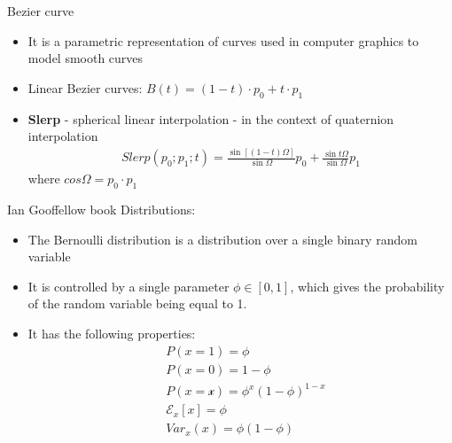 \documentclass[10pt,mathserif]{beamer}
\begin{document}
\begin{frame}{Bezier curve}
\begin{itemize}
\item It is a parametric representation of curves used in computer graphics to model smooth curves
\item Linear Bezier curves: $B(t) = (1-t)\cdot p_0 + t\cdot p_1$
\item \textbf{Slerp} - spherical linear interpolation - in the context of quaternion interpolation
\begin{align}
Slerp(p_0;p_1;t) =\frac{\sin[(1-t)\Omega]}{\sin\Omega}p_0 + \frac{\sin t\Omega}{\sin\Omega}p_1
\end{align}
where $cos\Omega = p_0\cdot p_1$
\end{itemize}
\end{frame}

\begin{frame}{Ian Gooffellow book}
Distributions:
\begin{itemize}
\item The Bernoulli distribution is a distribution over a single binary random variable
\item It is controlled by a single parameter $\phi \in [0,1]$, which gives the probability of the 
random variable being equal to 1.
\item It has the following properties:
\begin{align}
& P(x = 1) = \phi \\
& P(x = 0) = 1 - \phi \\
& P(x = \mathcal{x}) =\phi^x(1 - \phi)^{1-x} \\
& \mathcal{E}_x[x] = \phi \\
& Var_x(x) = \phi(1 - \phi)
\end{align}
\end{itemize}
\end{frame}
\end{document}
